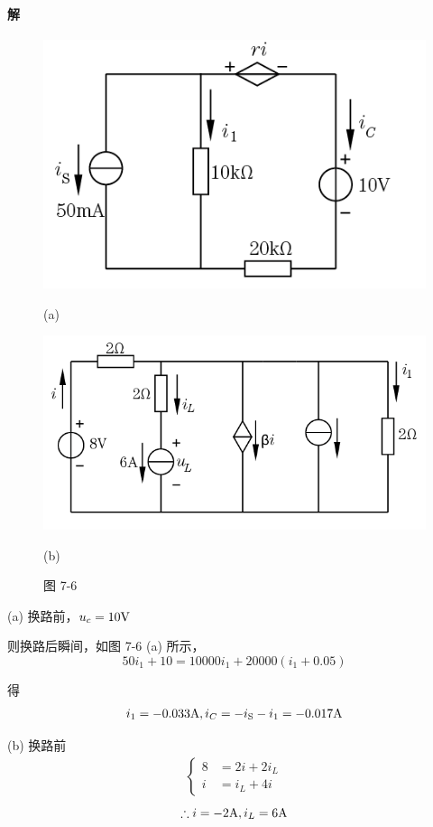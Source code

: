 \documentclass[hyperref, UTF8]{ctexart}
\newcommand{\volt}{{\rm V}}
\newcommand{\source}{{\rm S}}
\newcommand{\ampere}{{\rm A}}
\begin{document}
\paragraph{解}

\begin{figure}[!htb]
\centering
\begin{minipage}[t]{0.321\textwidth}
\centering
\includegraphics[width=1\textwidth]{p7-6-a-sol.png}
\caption*{(a)}
\end{minipage}
\begin{minipage}[t]{0.411\textwidth}
\centering
\includegraphics[width=1\textwidth]{p7-6-b-sol.png}
\caption*{(b)}
\end{minipage}
\caption*{图 7-6}
\end{figure}

(a) 换路前，$u_c=10\volt$

则换路后瞬间，如图 7-6 (a) 所示，
$$ 50i_1 + 10 = 10000i_1 + 20000(i_1+0.05) $$

得
$$i_1 = -0.033\ampere, i_C = -i_\source - i_1 = -0.017\ampere$$

(b) 换路前
\begin{align*}
\left\{ \begin{aligned}
8 &= 2i+2i_L \\
i &= i_L + 4i
\end{aligned} \right.
\end{align*}
$$\therefore i=-2 \ampere, i_L = 6\ampere $$
\end{document}
